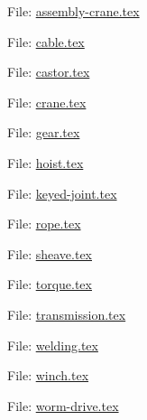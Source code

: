 \documentclass[notes]{mikoslides}
\begin{document}
\begin{center}\LARGE File: \url{assembly-crane.tex}\end{center}
\newpage
\begin{center}\LARGE File: \url{cable.tex}\end{center}
\newpage
\begin{center}\LARGE File: \url{castor.tex}\end{center}
\newpage
\begin{center}\LARGE File: \url{crane.tex}\end{center}
\newpage
\begin{center}\LARGE File: \url{gear.tex}\end{center}
\newpage
\begin{center}\LARGE File: \url{hoist.tex}\end{center}
\newpage
\begin{center}\LARGE File: \url{keyed-joint.tex}\end{center}
\newpage
\begin{center}\LARGE File: \url{rope.tex}\end{center}
\newpage
\begin{center}\LARGE File: \url{sheave.tex}\end{center}
\newpage
\begin{center}\LARGE File: \url{torque.tex}\end{center}
\newpage
\begin{center}\LARGE File: \url{transmission.tex}\end{center}
\newpage
\begin{center}\LARGE File: \url{welding.tex}\end{center}
\newpage
\begin{center}\LARGE File: \url{winch.tex}\end{center}
\newpage
\begin{center}\LARGE File: \url{worm-drive.tex}\end{center}
\newpage


\printindex
\end{document}
